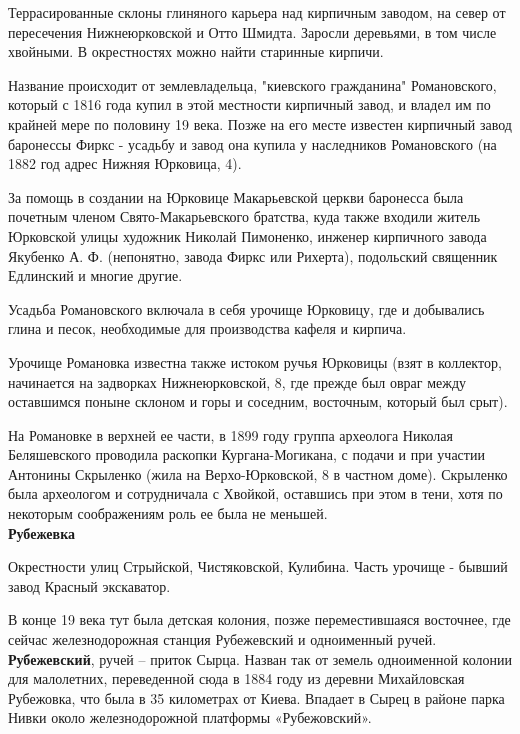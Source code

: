 Террасированные склоны глиняного карьера над кирпичным заводом, на север от пересечения Нижнеюрковской и Отто Шмидта. Заросли деревьями, в том числе хвойными. В окрестностях можно найти старинные кирпичи.

Название происходит от землевладельца, "киевского гражданина" Романовского, который с 1816 года купил в этой местности кирпичный завод, и владел им по крайней мере по половину 19 века. Позже на его месте известен кирпичный завод баронессы Фиркс - усадьбу и завод она купила у наследников Романовского (на 1882 год адрес Нижняя Юрковица, 4).

За помощь в создании на Юрковице Макарьевской церкви баронесса была почетным членом Свято-Макарьевского братства, куда также входили житель Юрковской улицы художник Николай Пимоненко, инженер кирпичного завода Якубенко А. Ф. (непонятно, завода Фиркс или Рихерта), подольский священник Едлинский и многие другие.

Усадьба Романовского включала в себя урочище Юрковицу, где и добывались глина и песок, необходимые для производства кафеля и кирпича.

Урочище Романовка известна также истоком ручья Юрковицы (взят в коллектор, начинается на задворках Нижнеюрковской, 8, где прежде был овраг между оставшимся поныне склоном и горы и соседним, восточным, который был срыт).

На Романовке в верхней ее части, в 1899 году группа археолога Николая Беляшевского   проводила раскопки Кургана-Могикана, с подачи и при участии Антонины Скрыленко (жила на Верхо-Юрковской, 8 в частном доме). Скрыленко была археологом и сотрудничала с Хвойкой, оставшись при этом в тени, хотя по некоторым соображениям роль ее была не меньшей.\\
  
\textbf{Рубежевка} 

Окрестности улиц Стрыйской, Чистяковской, Кулибина. Часть урочище - бывший завод Красный экскаватор.

В конце 19 века тут была детская колония, позже переместившаяся восточнее, где сейчас железнодорожная станция Рубежевский и одноименный ручей.\\

\textbf{Рубежевский}, ручей – приток Сырца. Назван так от земель одноименной колонии для малолетних, переведенной сюда в 1884 году из деревни Михайловская Рубежовка, что была в 35 километрах от Киева. Впадает в Сырец в районе парка Нивки около железнодорожной платформы «Рубежовский».\\

